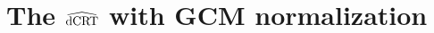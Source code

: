 \documentclass[aos]{imsart}
\theoremstyle{plain}
\theoremstyle{remark}
\newcommand{\dCRThat}{\widehat{\textnormal{dCRT}}}		%
\begin{document}
    
    
    
\clearpage

\appendix

\section{The $\dCRThat$ with GCM normalization} \label{sec:ndcrt}
\end{document}
